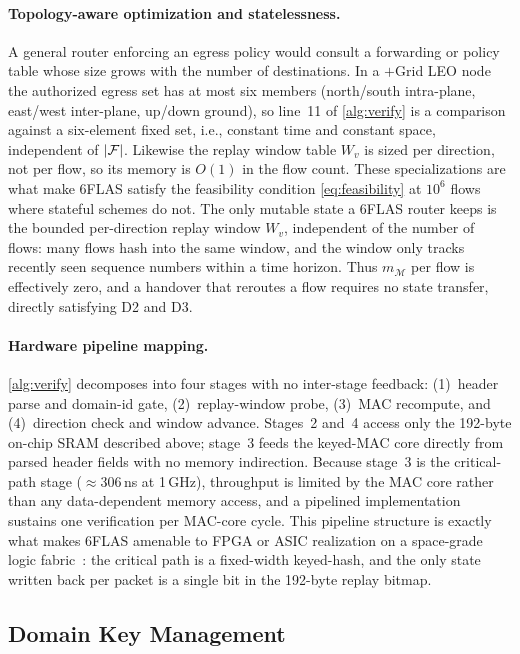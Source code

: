 \paragraph{Topology-aware optimization and statelessness.}
A general router enforcing an egress policy would consult a forwarding or
policy table whose size grows with the number of destinations. In a $+$Grid LEO
node the authorized egress set has at most six members (north/south intra-plane,
east/west inter-plane, up/down ground), so line~11 of \cref{alg:verify} is a
comparison against a six-element fixed set, i.e., constant time and constant
space, independent of $|\mathcal{F}|$. Likewise the replay window table $W_v$ is sized
per direction, not per flow, so its memory is $O(1)$ in the flow count. These
specializations are what make 6FLAS satisfy the feasibility condition
\cref{eq:feasibility} at $10^6$ flows where stateful schemes do not. The only
mutable state a 6FLAS router keeps is the bounded per-direction replay window
$W_v$, independent of the number of flows: many flows hash into the same window,
and the window only tracks recently seen sequence numbers within a time horizon.
Thus $m_{\mathcal{M}}$ per flow is effectively zero, and
a handover that reroutes a flow requires no state transfer, directly satisfying
D2 and D3.

\paragraph{Hardware pipeline mapping.}
\cref{alg:verify} decomposes into four stages with no inter-stage feedback:
(1)~header parse and domain-id gate, (2)~replay-window probe,
(3)~MAC recompute, and (4)~direction check and window advance.
Stages~2 and~4 access only the 192-byte on-chip SRAM described above; stage~3
feeds the keyed-MAC core directly from parsed header fields with no memory
indirection. Because stage~3 is the critical-path stage (${\approx}306$\,ns at
1\,GHz), throughput is limited by the MAC core rather than any data-dependent
memory access, and a pipelined implementation sustains one verification per
MAC-core cycle. This pipeline structure is exactly what makes 6FLAS amenable
to FPGA or ASIC realization on a space-grade logic fabric~\cite{li2022}: the
critical path is a fixed-width keyed-hash, and the only state written back per
packet is a single bit in the 192-byte replay bitmap.

\subsection{Domain Key Management}
\label{sec:keymgmt}

